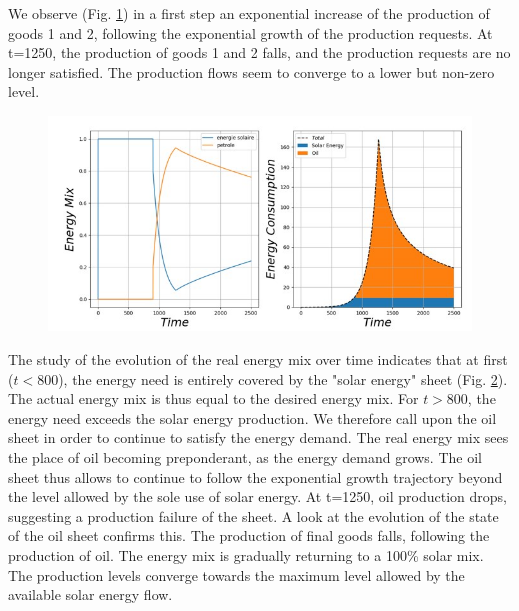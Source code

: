 \documentclass[12pt,a4paper]{article}%
\begin{document}
\begin{appendix}
\begin{figure}[h]
	\label{Fig11}
\end{figure} 
We observe (Fig. \ref{Fig11}) in a first step an exponential increase of the production of goods 1 and 2, following the exponential growth of the production requests. At t=1250, the production of goods 1 and 2 falls, and the production requests are no longer satisfied. The production flows seem to converge to a lower but non-zero level.  
\begin{figure}[h] 
	\centering 
	\includegraphics[width=1.0\textwidth]{figures/Energie12.jpg}
\label{Fig12}
\end{figure} 
The study of the evolution of the real energy mix over time indicates that at first ($t<800$), the energy need is entirely covered by the "solar energy" sheet (Fig. \ref{Fig12}). The actual energy mix is thus equal to the desired energy mix. For $t>800$, the energy need exceeds the solar energy production. We therefore call upon the oil sheet in order to continue to satisfy the energy demand. The real energy mix sees the place of oil becoming preponderant, as the energy demand grows. The oil sheet thus allows to continue to follow the exponential growth trajectory beyond the level allowed by the sole use of solar energy. At t=1250, oil production drops, suggesting a production failure of the sheet. A look at the evolution of the state of the oil sheet confirms this. The production of final goods falls, following the production of oil. The energy mix is gradually returning to a 100\% solar mix. The production levels converge towards the maximum level allowed by the available solar energy flow. 
 

\end{appendix}
\end{document}
